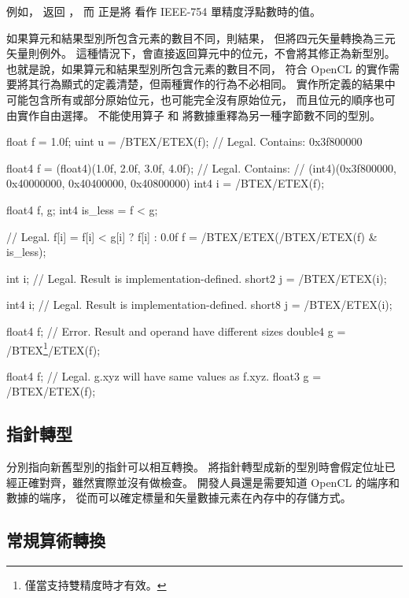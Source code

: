 例如，  返回 ，
而  正是將  看作 IEEE-754 單精度浮點數時的值。

如果算元和結果型別所包含元素的數目不同，則結果，
但將四元矢量轉換為三元矢量則例外。
這種情況下，會直接返回算元中的位元，不會將其修正為新型別。
也就是說，如果算元和結果型別所包含元素的數目不同，
符合 OpenCL 的實作需要將其行為顯式的定義清楚，但兩種實作的行為不必相同。
實作所定義的結果中可能包含所有或部分原始位元，也可能完全沒有原始位元，
而且位元的順序也可由實作自由選擇。
不能使用算子  和  將數據重釋為另一種字節數不同的型別。

\startexample
\startclc
float f = 1.0f;
uint u = /BTEX/ETEX(f);	// Legal. Contains:	0x3f800000

float4 f = (float4)(1.0f, 2.0f, 3.0f, 4.0f);
// Legal. Contains:
// (int4)(0x3f800000, 0x40000000, 0x40400000, 0x40800000)
int4 i = /BTEX/ETEX(f);

float4 f, g;
int4 is_less = f < g;

// Legal. f[i] = f[i] < g[i] ? f[i] : 0.0f
f = /BTEX/ETEX(/BTEX/ETEX(f) & is_less);

int i;
// Legal. Result is implementation-defined.
short2 j = /BTEX/ETEX(i);

int4 i;
// Legal. Result is implementation-defined.
short8 j = /BTEX/ETEX(i);

float4 f;
// Error. Result and operand have different sizes
double4 g = /BTEX\footnote{僅當支持雙精度時才有效。}/ETEX(f);

float4 f;
// Legal. g.xyz will have same values as f.xyz.
float3 g = /BTEX/ETEX(f);
\stopclc
\stopexample

\subsection{指針轉型}

分別指向新舊型別的指針可以相互轉換。
將指針轉型成新的型別時會假定位址已經正確對齊，雖然實際並沒有做檢查。
開發人員還是需要知道 OpenCL 的端序和數據的端序，
從而可以確定標量和矢量數據元素在內存中的存儲方式。

\subsection[sec:usualArithConv]{常規算術轉換}

